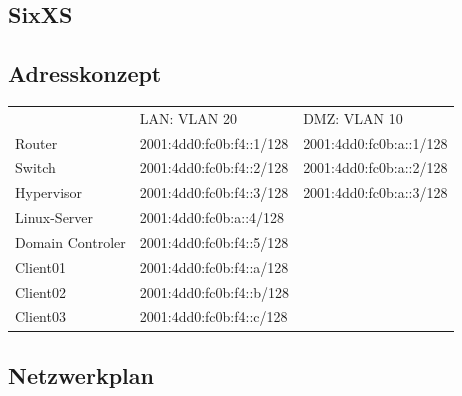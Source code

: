 \subsection{SixXS}

\subsection{Adresskonzept}

\begin{tabular}{|l|l|l|}
\hline
					& LAN: VLAN 20					& DMZ: VLAN 10 \\
Router				& 2001:4dd0:fc0b:f4::1/128		& 2001:4dd0:fc0b:a::1/128 \\
Switch				& 2001:4dd0:fc0b:f4::2/128		& 2001:4dd0:fc0b:a::2/128 \\
Hypervisor			& 2001:4dd0:fc0b:f4::3/128		& 2001:4dd0:fc0b:a::3/128 \\	
Linux-Server											& 2001:4dd0:fc0b:a::4/128 \\
Domain Controler 	& 2001:4dd0:fc0b:f4::5/128		& \\
Client01				& 2001:4dd0:fc0b:f4::a/128		& \\
Client02				& 2001:4dd0:fc0b:f4::b/128		& \\
Client03				& 2001:4dd0:fc0b:f4::c/128		& \\
\hline
\end{tabular}

\subsection{Netzwerkplan}

